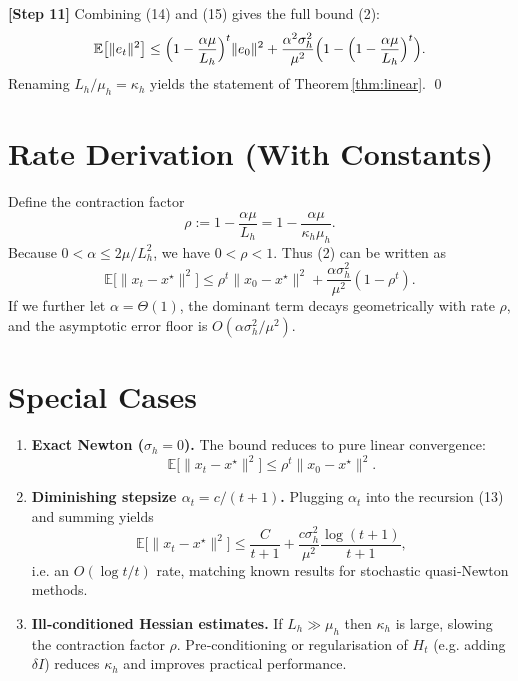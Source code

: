 \documentclass{article}
\begin{document}
\noindent\textbf{[Step 11]} Combining (14) and (15) gives the full bound (2):
\[
\mathbb{E}\bigl[\|e_{t}\|^{2}\bigr]
\le\Bigl(1-\frac{\alpha\mu}{L_{h}}\Bigr)^{t}\|e_{0}\|^{2}
+\frac{\alpha^{2}\sigma_{h}^{2}}{\mu^{2}}\Bigl(1-\Bigl(1-\frac{\alpha\mu}{L_{h}}\Bigr)^{t}\Bigr).
\]
Renaming $L_{h}/\mu_{h}=\kappa_{h}$ yields the statement of Theorem \ref{thm:linear}. \qed

\section*{Rate Derivation (With Constants)}
Define the contraction factor
\[
\rho:=1-\frac{\alpha\mu}{L_{h}}=1-\frac{\alpha\mu}{\kappa_{h}\mu_{h}}.
\]
Because $0<\alpha\le 2\mu/L_{h}^{2}$, we have $0<\rho<1$.  
Thus (2) can be written as
\[
\mathbb{E}\bigl[\|x_{t}-x^{\star}\|^{2}\bigr]
\le\rho^{t}\|x_{0}-x^{\star}\|^{2}
+\frac{\alpha\sigma_{h}^{2}}{\mu^{2}}(1-\rho^{t}).
\]
If we further let $\alpha=\Theta(1)$, the dominant term decays geometrically with rate $\rho$, and the asymptotic error floor is $O(\alpha\sigma_{h}^{2}/\mu^{2})$.

\section*{Special Cases}
\begin{enumerate}
\item \textbf{Exact Newton ($\sigma_{h}=0$).} The bound reduces to pure linear convergence:
\[
\mathbb{E}\bigl[\|x_{t}-x^{\star}\|^{2}\bigr]\le\rho^{t}\|x_{0}-x^{\star}\|^{2}.
\]
\item \textbf{Diminishing stepsize $\alpha_{t}=c/(t+1)$.} Plugging $\alpha_{t}$ into the recursion (13) and summing yields
\[
\mathbb{E}\bigl[\|x_{t}-x^{\star}\|^{2}\bigr]\le
\frac{C}{t+1}+ \frac{c\sigma_{h}^{2}}{\mu^{2}}\frac{\log(t+1)}{t+1},
\]
i.e. an $O(\log t/t)$ rate, matching known results for stochastic quasi‑Newton methods.
\item \textbf{Ill‑conditioned Hessian estimates.} If $L_{h}\gg\mu_{h}$ then $\kappa_{h}$ is large, slowing the contraction factor $\rho$. Pre‑conditioning or regularisation of $H_{t}$ (e.g. adding $\delta I$) reduces $\kappa_{h}$ and improves practical performance.
\end{enumerate}
\end{document}
